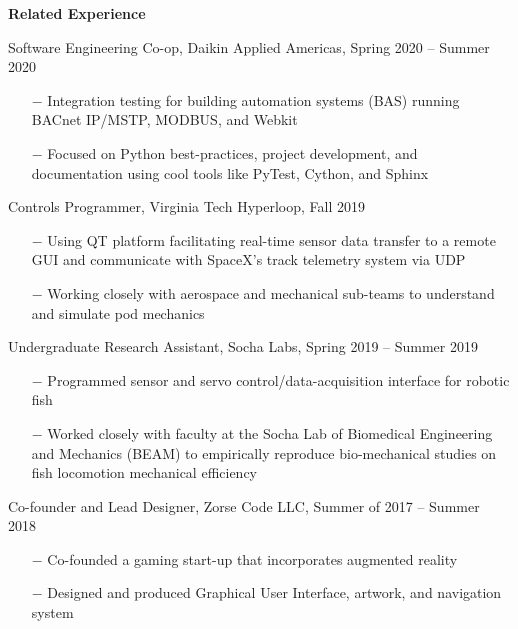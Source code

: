 \documentclass{article}
\begin{document}
\textbf{\large{Related Experience}} 

\vspace{5pt}

{\setlength{\leftskip}{15pt}

{\selectfont Software Engineering Co-op, Daikin Applied Americas, Spring 2020 – Summer 2020}
\vspace{-5pt}
\begin{itemize}
	\setlength{\leftskip}{15pt}
	\setlength\itemsep{-0.5em}
	\item[$-$] Integration testing for building automation systems (BAS) running BACnet IP/MSTP, MODBUS, and Webkit 
	\item[$-$] Focused on Python best-practices, project development, and documentation using cool tools like PyTest, Cython, and Sphinx
\end{itemize}

{\selectfont Controls Programmer, Virginia Tech Hyperloop, Fall 2019}
\vspace{-5pt}
\begin{itemize}
	\setlength{\leftskip}{15pt}
	\setlength\itemsep{-0.5em}
	\item[$-$] Using QT platform facilitating real-time sensor data transfer to a remote GUI and communicate with SpaceX's track telemetry system via UDP
	\item[$-$] Working closely with aerospace and mechanical sub-teams to understand and simulate pod mechanics
\end{itemize}

{\selectfont Undergraduate Research Assistant, Socha Labs, Spring 2019 – Summer 2019}
\vspace{-5pt}
\begin{itemize}
	\setlength{\leftskip}{15pt}
	\setlength\itemsep{-0.5em}
	\item[$-$] Programmed sensor and servo control/data-acquisition interface for robotic fish
	\item[$-$] Worked closely with faculty at the Socha Lab of Biomedical Engineering and Mechanics (BEAM) to empirically reproduce bio-mechanical studies on fish locomotion mechanical efficiency
\end{itemize}

{\selectfont Co-founder and Lead Designer, Zorse Code LLC, Summer of 2017 – Summer 2018}
\vspace{-5pt}
\begin{itemize}
	\setlength{\leftskip}{15pt}
	\setlength\itemsep{-0.5em}
	\item[$-$] Co-founded a gaming start-up that incorporates augmented reality 
	\item[$-$] Designed and produced Graphical User Interface, artwork, and navigation system
\end{itemize}

}
\end{document}
